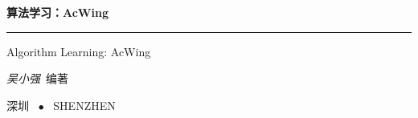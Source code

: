 \begin{titlepage}
    \vspace*{25ex}

    \hspace{0.05\textwidth}\begin{minipage}{.9\textwidth}
                               \flushright

                               {\textbf{算法学习：AcWing}}

                               \rule{\linewidth}{.5pt}

                               \vspace{2ex}

                               {\textsf{Algorithm Learning: AcWing}} \\

                               \vspace{20ex}

                               {\textit{吴小强}~编著}
    \end{minipage}

    \vfill

    \centering
    {深圳 ~$\bullet$ ~SHENZHEN}
\end{titlepage}
